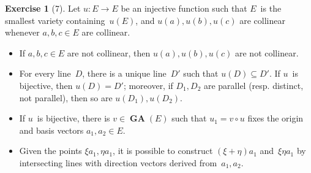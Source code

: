 \documentclass[letterpaper,12pt]{article}
\newcommand{\after}{\circ}
\DeclareMathOperator{\GA}{\mathbf{GA}}
\theoremstyle{definition}
\newtheorem*{exer}{Exercise}
\theoremstyle{remark}
\begin{document}
\begin{exer}[7]
Let \(u:E\to E\) be an injective function such that \(E\)~is the smallest variety containing~\(u(E)\), and \(u(a),u(b),u(c)\) are collinear whenever \(a,b,c\in E\) are collinear.
\begin{itemize}[itemsep=0pt]
\item If \(a,b,c\in E\) are not collinear, then \(u(a),u(b),u(c)\) are not collinear.
\item For every line~\(D\), there is a unique line~\(D'\) such that \(u(D)\subseteq D'\). If \(u\)~is bijective, then \(u(D)=D'\); moreover, if \(D_1,D_2\) are parallel (resp. distinct, not parallel), then so are \(u(D_1),u(D_2)\).
\item If \(u\)~is bijective, there is \(v\in\GA(E)\) such that \(u_1=v\after u\) fixes the origin and basis vectors \(a_1,a_2\in E\).
\item Given the points \(\xi a_1,\eta a_1\), it is possible to construct \((\xi+\eta)a_1\) and~\(\xi\eta a_1\) by intersecting lines with direction vectors derived from~\(a_1,a_2\).
\end{itemize}
\end{exer}
\end{document}
